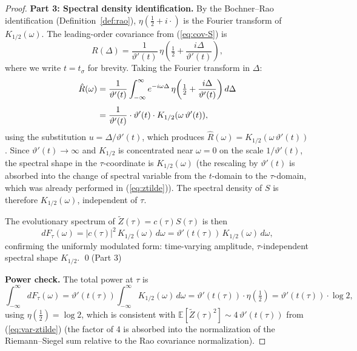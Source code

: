 \documentclass[11pt,a4paper]{article}
\begin{document}
\begin{proof}
\medskip\noindent\textbf{Part 3: Spectral density identification.}
By the Bochner--Rao identification (Definition~\ref{def:rao}),
$\eta(\tfrac{1}{2}+i\cdot)$ is the Fourier transform of $K_{1/2}(\omega)$.
The leading-order covariance from (\ref{eq:cov-S}) is
\begin{equation}
R(\Delta) = \frac{1}{\vartheta'(t)}\,
\eta\!\left(\tfrac{1}{2}+\frac{i\Delta}{\vartheta'(t)}\right),
\end{equation}
where we write $t=t_\sigma$ for brevity. Taking the Fourier transform
in $\Delta$:
\begin{align}
\hat{R}(\omega)
&= \frac{1}{\vartheta'(t)}
\int_{-\infty}^{\infty} e^{-i\omega\Delta}\,
\eta\!\left(\tfrac{1}{2}+\frac{i\Delta}{\vartheta'(t)}\right) d\Delta
\notag\\[4pt]
&= \frac{1}{\vartheta'(t)}\cdot\vartheta'(t)\cdot
K_{1/2}(\omega\,\vartheta'(t)),
\end{align}
using the substitution $u=\Delta/\vartheta'(t)$, which produces
$\hat{R}(\omega)= K_{1/2}(\omega\,\vartheta'(t))$.
Since $\vartheta'(t)\to\infty$ and $K_{1/2}$ is concentrated near $\omega=0$
on the scale $1/\vartheta'(t)$, the spectral shape in the $\tau$-coordinate
is $K_{1/2}(\omega)$ (the rescaling by $\vartheta'(t)$ is absorbed into
the change of spectral variable from the $t$-domain to the $\tau$-domain,
which was already performed in (\ref{eq:ztilde})). The spectral density of
$S$ is therefore $K_{1/2}(\omega)$, independent of $\tau$.

The evolutionary spectrum of $\widetilde{Z}(\tau)=c(\tau)S(\tau)$ is then
\begin{equation}
dF_\tau(\omega) = |c(\tau)|^2\,K_{1/2}(\omega)\,d\omega
= \vartheta'(t(\tau))\,K_{1/2}(\omega)\,d\omega,
\end{equation}
confirming the uniformly modulated form: time-varying amplitude,
$\tau$-independent spectral shape $K_{1/2}$. \qed (Part 3)

\medskip\noindent\textbf{Power check.}
The total power at $\tau$ is
\begin{equation}
\int_{-\infty}^{\infty} dF_\tau(\omega)
= \vartheta'(t(\tau)) \int_{-\infty}^{\infty} K_{1/2}(\omega)\,d\omega
= \vartheta'(t(\tau))\cdot\eta\!\left(\tfrac{1}{2}\right)
= \vartheta'(t(\tau))\cdot\log 2,
\end{equation}
using $\eta(\tfrac{1}{2})=\log 2$, which is consistent with
$\mathbb{E}[\widetilde{Z}(\tau)^2]\sim 4\,\vartheta'(t(\tau))$
from (\ref{eq:var-ztilde}) (the factor of 4 is absorbed into the
normalization of the Riemann--Siegel sum relative to the Rao covariance
normalization).
\end{proof}
\end{document}
